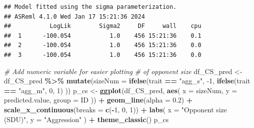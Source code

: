 \documentclass[
  12pt,
]{book}
\newenvironment{Shaded}{\begin{snugshade}}{\end{snugshade}}
\newcommand{\CommentTok}[1]{\textcolor[rgb]{0.56,0.35,0.01}{\textit{#1}}}
\newcommand{\DataTypeTok}[1]{\textcolor[rgb]{0.13,0.29,0.53}{#1}}
\newcommand{\DecValTok}[1]{\textcolor[rgb]{0.00,0.00,0.81}{#1}}
\newcommand{\FloatTok}[1]{\textcolor[rgb]{0.00,0.00,0.81}{#1}}
\newcommand{\KeywordTok}[1]{\textcolor[rgb]{0.13,0.29,0.53}{\textbf{#1}}}
\newcommand{\NormalTok}[1]{#1}
\newcommand{\OperatorTok}[1]{\textcolor[rgb]{0.81,0.36,0.00}{\textbf{#1}}}
\newcommand{\StringTok}[1]{\textcolor[rgb]{0.31,0.60,0.02}{#1}}
\begin{document}
\begin{Shaded}
\end{Shaded}

\begin{verbatim}
## Model fitted using the sigma parameterization.
## ASReml 4.1.0 Wed Jan 17 15:21:36 2024
##           LogLik        Sigma2     DF     wall    cpu
##  1      -100.054           1.0    456 15:21:36    0.1
##  2      -100.054           1.0    456 15:21:36    0.0
##  3      -100.054           1.0    456 15:21:36    0.0
\end{verbatim}

\begin{Shaded}
\begin{Highlighting}[]
\CommentTok{\# Add numeric variable for easier plotting}
\CommentTok{\# of opponent size}
\NormalTok{df\_CS\_pred \textless{}{-}}\StringTok{ }\NormalTok{df\_CS\_pred }\OperatorTok{\%\textgreater{}\%}
\StringTok{  }\KeywordTok{mutate}\NormalTok{(}\DataTypeTok{sizeNum =} \KeywordTok{ifelse}\NormalTok{(trait }\OperatorTok{==}\StringTok{ "agg\_s"}\NormalTok{, }\DecValTok{{-}1}\NormalTok{,}
    \KeywordTok{ifelse}\NormalTok{(trait }\OperatorTok{==}\StringTok{ "agg\_m"}\NormalTok{, }\DecValTok{0}\NormalTok{, }\DecValTok{1}\NormalTok{)}
\NormalTok{  ))}
\NormalTok{p\_cs \textless{}{-}}\StringTok{ }\KeywordTok{ggplot}\NormalTok{(df\_CS\_pred, }\KeywordTok{aes}\NormalTok{(}
  \DataTypeTok{x =}\NormalTok{ sizeNum,}
  \DataTypeTok{y =}\NormalTok{ predicted.value,}
  \DataTypeTok{group =}\NormalTok{ ID}
\NormalTok{)) }\OperatorTok{+}
\StringTok{  }\KeywordTok{geom\_line}\NormalTok{(}\DataTypeTok{alpha =} \FloatTok{0.2}\NormalTok{) }\OperatorTok{+}
\StringTok{  }\KeywordTok{scale\_x\_continuous}\NormalTok{(}\DataTypeTok{breaks =} \KeywordTok{c}\NormalTok{(}\OperatorTok{{-}}\DecValTok{1}\NormalTok{, }\DecValTok{0}\NormalTok{, }\DecValTok{1}\NormalTok{)) }\OperatorTok{+}
\StringTok{  }\KeywordTok{labs}\NormalTok{(}
    \DataTypeTok{x =} \StringTok{"Opponent size (SDU)"}\NormalTok{,}
    \DataTypeTok{y =} \StringTok{"Aggression"}
\NormalTok{  ) }\OperatorTok{+}
\StringTok{  }\KeywordTok{theme\_classic}\NormalTok{()}
\NormalTok{p\_cs}
\end{Highlighting}
\end{Shaded}
\end{document}
